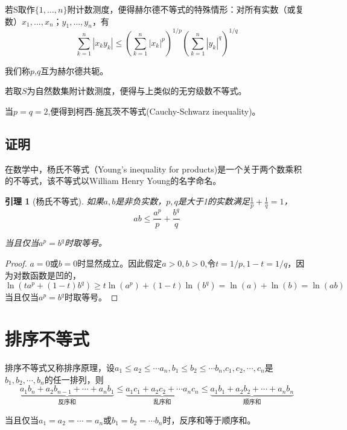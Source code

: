 \documentclass[a4paper]{article} %
\numberwithin{equation}{section} %
\newtheorem{Lemma}{引理}
\begin{document}
若S取作$\{1,\ldots,n\}$附计数测度，便得赫尔德不等式的特殊情形：对所有实数（或复数）$x_1,\ldots,x_n$；$y_1,\ldots,y_n$，有
\begin{equation}
\sum_{k=1}^n|x_ky_k|\le\left(\sum_{k=1}^n|x_k|^p\right)^{1/p}\left(\sum_{k=1}^n|y_k|^q\right)^{1/q}
\end{equation}

我们称$p$,$q$互为赫尔德共轭。

若取$S$为自然数集附计数测度，便得与上类似的无穷级数不等式。

当$p=q=2$,便得到柯西-施瓦茨不等式(Cauchy-Schwarz inequality)。

\subsection{证明}

在数学中，杨氏不等式（Young's inequality for products)是一个关于两个数乘积的不等式，该不等式以William Henry Young的名字命名。

\begin{Lemma}[杨氏不等式]
如果$a,b$是非负实数，$p,q$是大于1的实数满足$\displaystyle \frac{1}{p}+\frac{1}{q}=1$，
\begin{equation}
ab\le\frac{a^p}{p}+\frac{b^q}{q}
\end{equation}

当且仅当$a^p=b^q$时取等号。
\end{Lemma}
\begin{proof}
$a=0$或$b=0$时显然成立。因此假定$a>0,b>0$,令$t=1/p,1-t=1/q$，因为对数函数是凹的，
\begin{equation}
\ln(ta^p+(1-t)b^q)\ge t\ln(a^p)+(1-t)\ln(b^q)=\ln(a)+\ln(b)=\ln(ab)
\end{equation}
当且仅当$a^p=b^q$时取等号。
\end{proof}


\section{排序不等式}

排序不等式又称排序原理，设$a_1\le a_2\le \cdots a_n,b_1\le b_2\le\cdots b_n$,$c_1,c_2,\cdots,c_n$是$b_1,b_2,\cdots,b_n$的任一排列，则
\begin{equation}
 \underbrace{a_1b_n+a_2b_{n-1}+\cdots+a_nb_1}_{\text{反序和}}\le \underbrace{a_1c_1+a_2c_2+\cdots a_nc_n}_{\text{乱序和}}\le\underbrace{a_1b_1+a_2b_2+\cdots+a_nb_n}_{\text{顺序和}} 
\end{equation}

当且仅当$a_1=a_2=\cdots=a_n$或$b_1=b_2=\cdots b_n$时，反序和等于顺序和。
\end{document}
